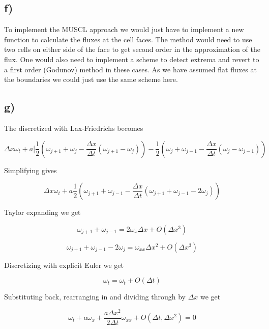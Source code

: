 \documentclass{article}
\newcommand{\oh}{\frac{1}{2}}
\begin{document}
\subsection{f)}
To implement the MUSCL approach we would just have to implement a new function to calculate the fluxes at the cell faces. The method would need to use two cells on either side of the face to get second order in the approximation of the flux. One would also need to implement a scheme to detect extrema and revert to a first order (Godunov) method in these cases. As we have assumed flat fluxes at the boundaries we could just use the same scheme here.

\subsection{g)}

The discretized with Lax-Friedrichs becomes 

\begin{equation}
\Delta x \omega_t + a [\oh(\omega_{j+1} + \omega_j - \frac{\Delta x}{\Delta t}(\omega_{j+1} - \omega_j) ) - \oh(\omega_{j} + \omega_{j-1} - \frac{\Delta x}{\Delta t}(\omega_{j} - \omega_{j-1}) ) 
\end{equation}

Simplifying gives

\begin{equation}
\Delta x \omega_t + a \oh(\omega_{j+1} + \omega_{j-1} - \frac{\Delta x}{\Delta t}(\omega_{j+1} + \omega_{j-1} - 2\omega_j) ) 
\end{equation}

Taylor expanding we get

\begin{equation}
\omega_{j+1} + \omega_{j-1}  = 2 \omega_x \Delta x + O(\Delta x^3)
\end{equation}

\begin{equation}
\omega_{j+1} + \omega_{j-1} - 2\omega_j = \omega_{xx} \Delta x^2 + O(\Delta x^3)
\end{equation}

Discretizing with explicit Euler we get

\begin{equation}
\omega_t = \omega_t + O(\Delta t)
\end{equation}

Substituting back, rearranging in and dividing through by $\Delta x$ we get

\begin{equation}
	\omega_t + a \omega_x + \frac{a\Delta x^2}{2\Delta t}\omega_{xx} + O(\Delta t, \Delta x^2) = 0
\end{equation}
\end{document}

